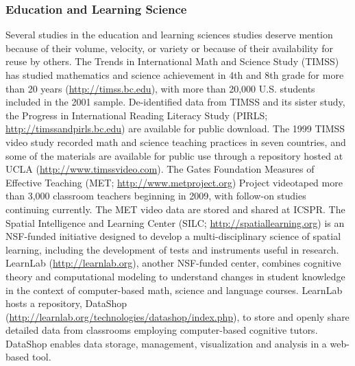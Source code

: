\documentclass[letterpaper,man,apacite,natbib]{apa6}
\begin{document}
\subsubsection{Education and Learning Science}
Several studies in the education and learning sciences studies deserve mention because of their volume, velocity, or variety or because of their availability for reuse by others.
The Trends in International Math and Science Study (TIMSS) has studied mathematics and science achievement in 4th and 8th grade for more than 20 years (\url{http://timss.bc.edu}), with more than 20,000 U.S. students included in the 2001 sample.
De-identified data from TIMSS and its sister study, the Progress in International Reading Literacy Study (PIRLS; \url{http://timssandpirls.bc.edu}) are available for public download.
The 1999 TIMSS video study recorded math and science teaching practices in seven countries, and some of the materials are available for public use through a repository hosted at UCLA (\url{http://www.timssvideo.com}).
The Gates Foundation Measures of Effective Teaching (MET; \url{http://www.metproject.org}) Project videotaped more than 3,000 classroom teachers beginning in 2009, with follow-on studies continuing currently.
The MET video data are stored and shared at ICSPR.
The Spatial Intelligence and Learning Center (SILC; \url{http://spatiallearning.org}) is an NSF-funded initiative designed to develop a multi-disciplinary science of spatial learning, including the development of tests and instruments useful in research.
LearnLab (\url{http://learnlab.org}), another NSF-funded center, combines cognitive theory and computational modeling to understand changes in student knowledge in the context of computer-based math, science and language courses. 
LearnLab hosts a repository, DataShop (\url{http://learnlab.org/technologies/datashop/index.php}), to store and openly share detailed data from classrooms employing computer-based cognitive tutors.
DataShop enables data storage, management, visualization and analysis in a web-based tool.
\end{document}
